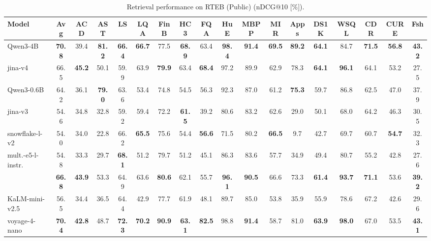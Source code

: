 \documentclass[11pt]{article}
\begin{document}
\begin{table}[H]
\caption{Retrieval performance on RTEB (Public) (nDCG@10 [\%]).}
\label{tab:rteb_public_retrieval}
\centering
\small
\setlength{\tabcolsep}{1.2pt}
\begin{tabular}{l*{17}{c}}
\toprule
\textbf{Model} &
\textbf{Avg} &
\textbf{ACD} &
\textbf{AST} &
\textbf{LS} &
\textbf{LQA} &
\textbf{FinB} &
\textbf{HC3} &
\textbf{FQA} &
\textbf{HuE} &
\textbf{MBPP} &
\textbf{MIR} &
\textbf{Apps} &
\textbf{DS1K} &
\textbf{WSQL} &
\textbf{CDR} &
\textbf{CURE} &
\textbf{Fsh} \\
\midrule
Qwen3-4B & \textbf{70.8} & 39.4 & \textbf{81.2} & \textbf{66.4} & \textbf{66.7} & 77.5 & \textbf{68.9} & 63.4 & \textbf{98.4} & \textbf{91.4} & \textbf{69.5} & \textbf{89.2} & \textbf{64.1} & 84.7 & \textbf{71.5} & \textbf{56.8} & \textbf{43.2} \\
jina-v4 & 66.5 & \textbf{45.2} & 50.1 & 59.9 & 63.9 & \textbf{79.9} & 63.4 & \textbf{68.4} & 97.2 & 89.9 & 62.9 & 78.3 & \textbf{64.1} & \textbf{96.1} & 64.1 & 53.2 & 27.5 \\
\midrule
Qwen3-0.6B & 64.2 & 36.1 & \textbf{79.0} & 63.6 & 53.4 & 74.8 & 54.5 & 56.3 & 92.3 & 87.0 & 61.2 & \textbf{75.3} & 59.7 & 86.8 & 62.5 & 47.0 & 37.9 \\
jina-v3 & 54.6 & 34.8 & 32.8 & 59.2 & 59.4 & 72.2 & \textbf{61.5} & 39.2 & 80.6 & 83.2 & 62.6 & 29.0 & 50.1 & 68.0 & 64.2 & 46.3 & 30.5 \\
snowflake-l-v2 & 54.0 & 34.0 & 22.8 & 66.2 & \textbf{65.5} & 75.6 & 54.4 & \textbf{56.6} & 71.5 & 80.2 & \textbf{66.5} & 9.7 & 42.7 & 69.7 & 60.7 & \textbf{54.7} & 32.3 \\
mult.-e5-l-instr. & 54.8 & 33.3 & 29.7 & \textbf{68.1} & 51.2 & 79.7 & 51.2 & 45.1 & 86.3 & 83.6 & 57.7 & 34.9 & 49.4 & 80.7 & 55.2 & 42.8 & 27.6 \\
\JEmbeddingVFiveTextSmallShort{} & \textbf{66.8} & \textbf{43.9} & 53.3 & 64.9 & 63.6 & \textbf{80.6} & 62.1 & 55.7 & \textbf{96.1} & \textbf{90.5} & 66.6 & 73.3 & \textbf{61.4} & \textbf{93.7} & \textbf{71.1} & 53.6 & \textbf{39.2} \\
\midrule
KaLM-mini-v2.5 & 56.5 & 34.4 & 36.5 & 64.4 & 42.9 & 77.7 & 61.9 & 48.1 & 89.7 & 85.0 & 53.8 & 35.9 & 55.9 & 78.6 & 67.2 & 42.6 & 29.6 \\
voyage-4-nano & \textbf{70.4} & \textbf{42.8} & 48.7 & \textbf{72.3} & \textbf{70.2} & \textbf{90.9} & \textbf{63.1} & \textbf{82.5} & 98.8 & \textbf{91.4} & 58.7 & 81.0 & \textbf{63.9} & \textbf{98.0} & 67.0 & 53.5 & \textbf{43.1} \\

\end{tabular}
\end{table}
\end{document}
